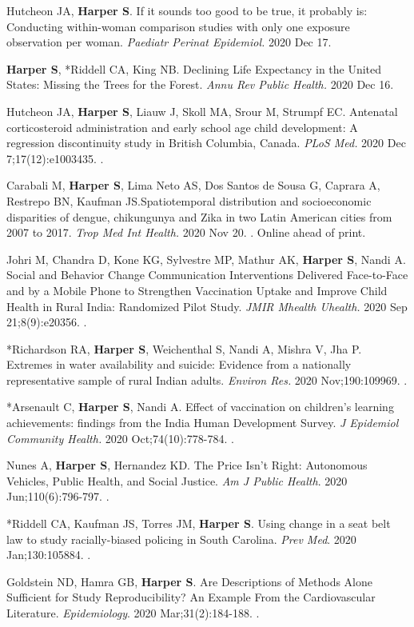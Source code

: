 \documentclass[
  letterpaper,
  DIV=11,
  numbers=noendperiod]{scrartcl}
\begin{document}
Hutcheon JA, \textbf{Harper S}. If it sounds too good to be true, it
probably is: Conducting within-woman comparison studies with only one
exposure observation per woman. \emph{Paediatr Perinat Epidemiol.} 2020
Dec 17.

\textbf{Harper S}, *Riddell CA, King NB. Declining Life Expectancy in
the United States: Missing the Trees for the Forest. \emph{Annu Rev
Public Health.} 2020 Dec 16.

Hutcheon JA, \textbf{Harper S}, Liauw J, Skoll MA, Srour M, Strumpf EC.
Antenatal corticosteroid administration and early school age child
development: A regression discontinuity study in British Columbia,
Canada. \emph{PLoS Med.} 2020 Dec 7;17(12):e1003435. .

Carabali M, \textbf{Harper S}, Lima Neto AS, Dos Santos de Sousa G,
Caprara A, Restrepo BN, Kaufman JS.Spatiotemporal distribution and
socioeconomic disparities of dengue, chikungunya and Zika in two Latin
American cities from 2007 to 2017. \emph{Trop Med Int Health.} 2020 Nov
20. . Online ahead of print.

Johri M, Chandra D, Kone KG, Sylvestre MP, Mathur AK, \textbf{Harper S},
Nandi A. Social and Behavior Change Communication Interventions
Delivered Face-to-Face and by a Mobile Phone to Strengthen Vaccination
Uptake and Improve Child Health in Rural India: Randomized Pilot Study.
\emph{JMIR Mhealth Uhealth.} 2020 Sep 21;8(9):e20356. .

*Richardson RA, \textbf{Harper S}, Weichenthal S, Nandi A, Mishra V, Jha
P. Extremes in water availability and suicide: Evidence from a
nationally representative sample of rural Indian adults. \emph{Environ
Res.} 2020 Nov;190:109969. .

*Arsenault C, \textbf{Harper S}, Nandi A. Effect of vaccination on
children's learning achievements: findings from the India Human
Development Survey. \emph{J Epidemiol Community Health.} 2020
Oct;74(10):778-784. .

Nunes A, \textbf{Harper S}, Hernandez KD. The Price Isn't Right:
Autonomous Vehicles, Public Health, and Social Justice. \emph{Am J
Public Health}. 2020 Jun;110(6):796-797. .

*Riddell CA, Kaufman JS, Torres JM, \textbf{Harper S}. Using change in a
seat belt law to study racially-biased policing in South Carolina.
\emph{Prev Med}. 2020 Jan;130:105884. .

Goldstein ND, Hamra GB, \textbf{Harper S}. Are Descriptions of Methods
Alone Sufficient for Study Reproducibility? An Example From the
Cardiovascular Literature. \emph{Epidemiology}. 2020 Mar;31(2):184-188.
.
\end{document}

